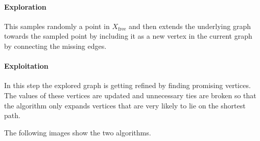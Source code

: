 \documentclass[conference]{IEEEtran}
\begin{document}
\paragraph{Exploration}
This samples randomly a point in $X_\text{free}$ and then extends the underlying graph towards the sampled point by including it as a new vertex in the current graph by connecting the missing edges. \cite{OktayArslan.December2015}\\
\paragraph{Exploitation}
In this step the explored graph is getting refined by finding promising vertices. The values of these vertices are updated and unnecessary ties are broken so that the algorithm only expands vertices that are very likely to lie on the shortest path.

The following images show the two algorithms.
\end{document}
